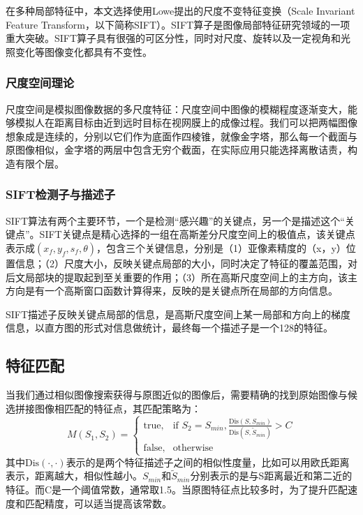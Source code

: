 \documentclass[UTF8]{csoarticle}
\begin{document}
在多种局部特征中，本文选择使用Lowe提出的尺度不变特征变换（Scale Invariant Feature Transform，以下简称SIFT）。SIFT算子是图像局部特征研究领域的一项重大突破。SIFT算子具有很强的可区分性，同时对尺度、旋转以及一定视角和光照变化等图像变化都具有不变性。

\subsubsection{尺度空间理论}
尺度空间是模拟图像数据的多尺度特征：尺度空间中图像的模糊程度逐渐变大，能够模拟人在距离目标由近到远时目标在视网膜上的成像过程。我们可以把两幅图像想象成是连续的，分别以它们作为底面作四棱锥，就像金字塔，那么每一个截面与原图像相似，金字塔的两层中包含无穷个截面，在实际应用只能选择离散诘责，构造有限个层。

\subsubsection{SIFT检测子与描述子}
SIFT算法有两个主要环节，一个是检测“感兴趣”的关键点，另一个是描述这个“关键点”。SIFT关键点是精心选择的一组在高斯差分尺度空间上的极值点，该关键点表示成\((x_f,y_f,s_f,\theta)\)，包含三个关键信息，分别是（1）亚像素精度的（x，y）位置信息；（2）尺度大小，反映关键点局部的大小，同时决定了特征的覆盖范围，对后文局部块的提取起到至关重要的作用；（3）所在高斯尺度空间上的主方向，该主方向是有一个高斯窗口函数计算得来，反映的是关键点所在局部的方向信息。

SIFT描述子反映关键点局部的信息，是高斯尺度空间上某一局部和方向上的梯度信息，以直方图的形式对信息做统计，最终每一个描述子是一个128的特征。

\subsection{特征匹配}
当我们通过相似图像搜索获得与原图近似的图像后，需要精确的找到原始图像与候选拼接图像相匹配的特征点，其匹配策略为：
\begin{equation}
  M(S_1,S_2) = 
\begin{cases} 
\text{true}, & \mbox{if } S_2 = S_{min},\frac{\text{Dis}(S,S_{min})}{\text{Dis}(S,\tilde{S}_{min})} > C \\
\text{false}, & \mbox{otherwise}
\end{cases}
\end{equation}
其中\(\text{Dis}(\cdot,\cdot)\)表示的是两个特征描述子之间的相似性度量，比如可以用欧氏距离表示，距离越大，相似性越小。\(S_{min}\)和\(\tilde{S}_{min}\)分别表示的是与S距离最近和第二近的特征。而C是一个阈值常数，通常取1.5。当原图特征点比较多时，为了提升匹配速度和匹配精度，可以适当提高该常数。
\end{document}
